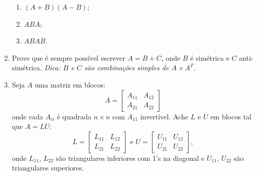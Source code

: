 \documentclass[leqno]{article}
\numberwithin{equation}{section}
\begin{document}
\begin{enumerate}
\begin{enumerate}
\item $(A + B)(A - B)$;

\begin{sol} 
\end{sol} 

\item $ABA$;

\begin{sol} 
\end{sol} 

\item $ABAB$.

\begin{sol} 
\end{sol} 

\end{enumerate}

\item Prove que é sempre possível escrever $A = B + C$, onde $B$ é simétrica e $C$ anti-simétrica. \textit{Dica: $B$ e $C$ são combinações simples de $A$ e $A^T$.}

\begin{sol} 
\end{sol} 

\item Seja $A$ uma matriz em blocos:
$$A = \begin{bmatrix}
A_{11} & A_{12}\\
A_{21} & A_{22}
\end{bmatrix}$$
onde cada $A_{ii}$ é quadrada $n \times n$ com $A_{11}$ invertível. Ache $L$ e $U$ em blocos tal que $A = LU$:
$$L = \begin{bmatrix}
L_{11} & L_{12}\\
L_{21} & L_{22}
\end{bmatrix} \mbox{ e } U = \begin{bmatrix}
U_{11} & U_{12}\\
U_{21} & U_{22}
\end{bmatrix},$$
onde $L_{11}$, $L_{22}$ são triangulares inferiores com 1's na diagonal e $U_{11}$, $U_{22}$ são triangulares superiores.
\end{enumerate}

\begin{sol} 
\end{sol} 
\end{document}
